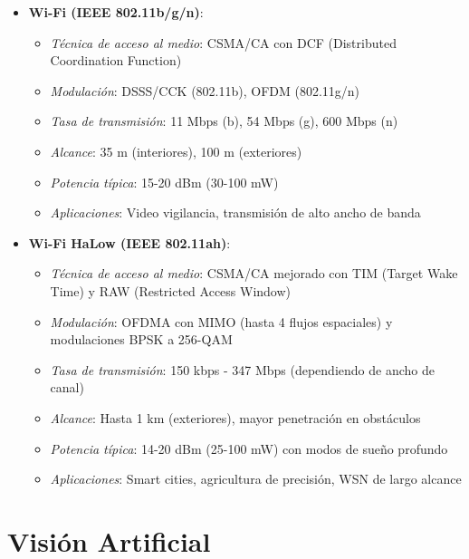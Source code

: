 \begin{itemize}
    \item \textbf{Wi-Fi (IEEE 802.11b/g/n)}:
        \begin{itemize}
            \item \textit{Técnica de acceso al medio}: CSMA/CA con DCF (Distributed Coordination Function)
            \item \textit{Modulación}: DSSS/CCK (802.11b), OFDM (802.11g/n)
            \item \textit{Tasa de transmisión}: 11 Mbps (b), 54 Mbps (g), 600 Mbps (n)
            \item \textit{Alcance}: 35 m (interiores), 100 m (exteriores)
            \item \textit{Potencia típica}: 15-20 dBm (30-100 mW)
            \item \textit{Aplicaciones}: Video vigilancia, transmisión de alto ancho de banda \cite{gerenciatecnologicainformatica2013}
        \end{itemize}
    
    \item \textbf{Wi-Fi HaLow (IEEE 802.11ah)}:
        \begin{itemize}
            \item \textit{Técnica de acceso al medio}: CSMA/CA mejorado con TIM (Target Wake Time) y RAW (Restricted Access Window)
            \item \textit{Modulación}: OFDMA con MIMO (hasta 4 flujos espaciales) y modulaciones BPSK a 256-QAM
            \item \textit{Tasa de transmisión}: 150 kbps - 347 Mbps (dependiendo de ancho de canal)
            \item \textit{Alcance}: Hasta 1 km (exteriores), mayor penetración en obstáculos
            \item \textit{Potencia típica}: 14-20 dBm (25-100 mW) con modos de sueño profundo
            \item \textit{Aplicaciones}: Smart cities, agricultura de precisión, WSN de largo alcance \cite{Adame2014}
        \end{itemize}
\end{itemize}


 \section{Visión Artificial}
 
